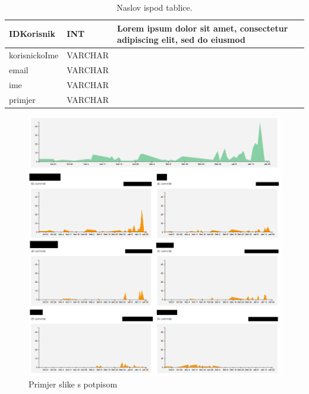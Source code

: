 		\begin{table}[H]
			
			
			
			\begin{longtabu} to \textwidth {|X[8, l]|X[8, l]|X[16, l]|} %
				
				\hline 
				\endfirsthead
				
				\hline 
				\endhead
				
				\hline 
				\endlastfoot
				
				IDKorisnik & INT	&  	Lorem ipsum dolor sit amet, consectetur adipiscing elit, sed do eiusmod  	\\ \hline
				korisnickoIme	& VARCHAR &   	\\ \hline 
				email & VARCHAR &   \\ \hline 
				ime & VARCHAR	&  		\\ \hline 
				 primjer	& VARCHAR &   	\\ \hline 
				
				
			\end{longtabu}
	
			\caption{\label{tab:referencatablica} Naslov ispod tablice.}
		\end{table}
		
		\begin{figure}[H]
			\includegraphics[scale=0.4]{slike/aktivnost.PNG}
			\centering
			\caption{Primjer slike s potpisom}
			\label{fig:promjene}
		\end{figure}
		
